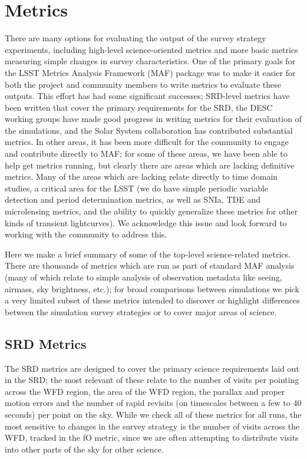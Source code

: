 \section{Metrics}

There are many options for evaluating the output of the survey strategy experiments, including high-level science-oriented metrics and more basic metrics measuring simple changes in survey characteristics. One of the primary goals for the LSST Metrics Analysis Framework (MAF) package was to make it easier for both the project and community members to write metrics to evaluate these outputs. This effort has had some significant successes; SRD-level metrics have been written that cover the primary requirements for the SRD, the DESC working groups have made good progress in writing metrics for their evaluation of the simulations, and the Solar System collaboration has contributed substantial metrics. In other areas, it has been more difficult for the community to engage and contribute directly to MAF; for some of these areas, we have been able to help get metrics running, but clearly there are areas which are lacking definitive metrics. Many of the areas which are lacking relate directly to time domain studies, a critical area for the LSST (we do have simple periodic variable detection and period determination metrics, as well as SNIa, TDE and microlensing metrics, and the ability to quickly generalize these metrics for other kinds of transient lightcurves). We acknowledge this issue and look forward to working with the community to address this. 

Here we make a brief summary of some of the top-level science-related metrics. There are thousands of metrics which are run as part of standard MAF analysis (many of which relate to simple analysis of observation metadata like seeing, airmass, sky brightness, etc.); for broad comparisons between simulations we pick a very limited subset of these metrics intended to discover or highlight differences between the simulation survey strategies or to cover major areas of science. 

\subsection{SRD Metrics}

The SRD metrics are designed to cover the primary science requirements laid out in the SRD; the most relevant of these relate to the number of visits per pointing across the WFD region, the area of the WFD region, the parallax and proper motion errors and the number of rapid revisits (on timescales between a few to 40 seconds) per point on the sky. While we check all of these metrics for all runs, the most sensitive to changes in the survey strategy is the number of visits across the WFD, tracked in the fO metric, since we are often attempting to distribute visits into other parts of the sky for other science. 

